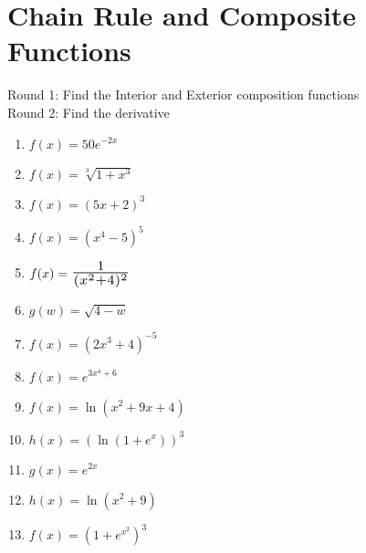 \documentclass[14pt]{extarticle}
\newcommand*{\Scale}[2][1.5]{\scalebox{#1}{\ensuremath{#2}}}%
\begin{document}
\section{Chain Rule and Composite Functions}
Round 1: Find the Interior and Exterior composition functions\\
Round 2: Find the derivative
	\begin{enumerate}
		\item $f(x) = 50e^{-2x}$
		\vspace{3cm}
\cleardoublepage		
		\item $f(x) = \sqrt[3]{1+x^3}$
		\vspace{3cm}
		
		\item $f(x) = (5x+2)^3$
		\vspace{3cm}
		
		\item $f(x) = (x^4 - 5)^5$
		\vspace{3cm}
			
		\item $f(x) = \Scale[1.5]{\frac{1}{(x^2+4)^2}}$
		\vspace{3cm}
		
		\item $g(w) = \sqrt{4-w}$
		\vspace{3cm}
		
		\item $f(x) = (2x^3 + 4)^{-5}$
		\vspace{3cm}
		
		\item $f(x) = e^{3x^4+6}$
		\vspace{3cm}
		
		\item $ f(x) = \ln(x^2+9x+4)$	
		\vspace{3cm}
		
		\item $h(x) = (\ln(1+e^x))^3$
		\vspace{3cm}
		
		\item $g(x) =e^{2x}$
		\vspace{3cm}
		
		\item $h(x) = \ln(x^2+9)$
		\vspace{3cm}
		
		\item $f(x) = (1+e^{x^2})^3$
	\end{enumerate}
\vspace{3cm}
\end{document}
